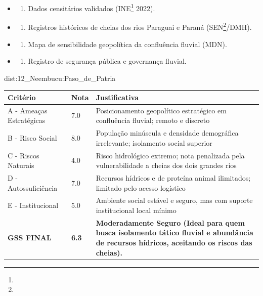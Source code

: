 {\begin{itemize}
\tightlist
\item
  \begin{enumerate}
  \def\labelenumi{\arabic{enumi})}
  \tightlist
  \item
    Dados censitários validados (INE\footnote{\fineINE} 2022).
  \end{enumerate}
\item
  \begin{enumerate}
  \def\labelenumi{\arabic{enumi})}
  \setcounter{enumi}{1}
  \tightlist
  \item
    Registros históricos de cheias dos rios Paraguai e Paraná (SEN\footnote{\fineSEN}/\allowbreak DMH).
  \end{enumerate}
\item
  \begin{enumerate}
  \def\labelenumi{\arabic{enumi})}
  \setcounter{enumi}{2}
  \tightlist
  \item
    Mapa de sensibilidade geopolítica da confluência fluvial (MDN).
  \end{enumerate}
\item
  \begin{enumerate}
  \def\labelenumi{\arabic{enumi})}
  \setcounter{enumi}{3}
  \tightlist
  \item
    Registro de segurança pública e governança fluvial.
  \end{enumerate}
\end{itemize}}{dist:12_Neembucu:Paso_de_Patria}
\begin{table}[ht!]
\small \begin{tabular}{p{3.0cm}p{0.8cm}p{6.0cm}} \toprule
\textbf{Critério} & \textbf{Nota} & \textbf{Justificativa} \\ \midrule
A - Ameaças Estratégicas & 7.0 & Posicionamento geopolítico estratégico em confluência fluvial; remoto e discreto \\
B - Risco Social & 8.0 & População minúscula e densidade demográfica irrelevante; isolamento social superior \\
C - Riscos Naturais & 4.0 & Risco hidrológico extremo; nota penalizada pela vulnerabilidade a cheias dos dois grandes rios \\
D - Autossuficiência & 7.0 & Recursos hídricos e de proteína animal ilimitados; limitado pelo acesso logístico \\
E - Institucional & 5.0 & Ambiente social estável e seguro, mas com suporte institucional local mínimo \\
\midrule \textbf{GSS FINAL} & \textbf{6.3} & \textbf{Moderadamente Seguro (Ideal para quem busca isolamento tático fluvial e abundância de recursos hídricos, aceitando os riscos das cheias).} \\ \bottomrule \end{tabular}
\end{table}
